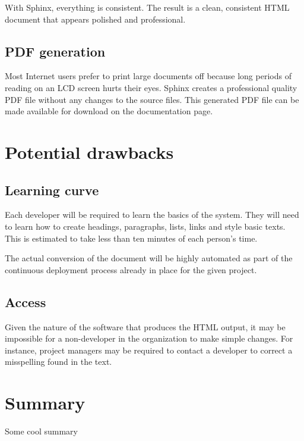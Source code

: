 \documentclass[letterpaper]{report}
\begin{document}
        With Sphinx, everything is consistent. The result is a clean,
        consistent HTML document that appears polished and professional.

    \subsection*{PDF generation}

        Most Internet users prefer to print large documents off because long
        periods of reading on an LCD screen hurts their eyes. Sphinx creates a
        professional quality PDF file without any changes to the source files.
        This generated PDF file can be made available for download on the
        documentation page.

\section*{Potential drawbacks}

    \subsection*{Learning curve}
    
        Each developer will be required to learn the basics of the system. They
        will need to learn how to create headings, paragraphs, lists, links and
        style basic texts. This is estimated to take less than ten minutes of
        each person's time.

        The actual conversion of the document will be highly automated as part
        of the continuous deployment process already in place for the given
        project.

    \subsection*{Access}

        Given the nature of the software that produces the HTML output, it may
        be impossible for a non-developer in the organization to make simple
        changes. For instance, project managers may be required to contact a
        developer to correct a misspelling found in the text.

\section*{Summary}

    Some cool summary
\end{document}
